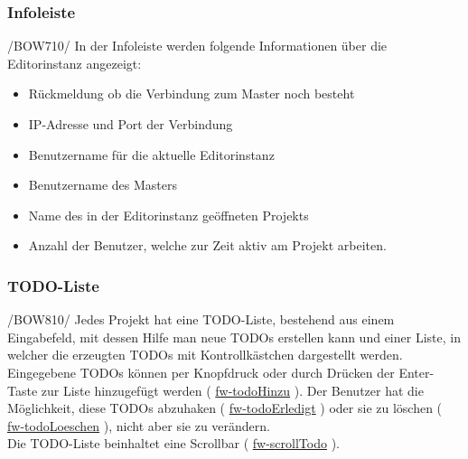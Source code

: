 \documentclass{scrartcl}
\newcommand{\refFunction}[1]{%
  \hyperlink{#1}{\csname #1\endcsname}%
  }
\begin{document}
\subsubsection{Infoleiste}
\label{subsubsec:info}
/BOW710/
In der Infoleiste werden folgende Informationen über die Editorinstanz angezeigt:
\begin{itemize}
\item Rückmeldung ob die Verbindung zum Master noch besteht
\item IP-Adresse und Port der Verbindung
\item Benutzername für die aktuelle Editorinstanz
\item Benutzername des Masters
\item Name des in der Editorinstanz geöffneten Projekts
\item Anzahl der Benutzer, welche zur Zeit aktiv am Projekt arbeiten.
\end{itemize}

\subsubsection{TODO-Liste}
\label{subsubsec:todo}
/BOW810/ 
Jedes Projekt hat eine TODO-Liste, bestehend aus einem Eingabefeld, mit dessen Hilfe man neue TODOs erstellen kann und einer Liste, in welcher die erzeugten TODOs mit Kontrollkästchen dargestellt werden. Eingegebene TODOs können per Knopfdruck oder durch Drücken der Enter-Taste zur Liste hinzugefügt werden (\refFunction{fw-todoHinzu}). Der Benutzer hat die Möglichkeit, diese TODOs abzuhaken (\refFunction{fw-todoErledigt}) oder sie zu löschen (\refFunction{fw-todoLoeschen}), nicht aber sie zu verändern. \\
Die TODO-Liste beinhaltet eine Scrollbar (\refFunction{fw-scrollTodo}).
\end{document}
